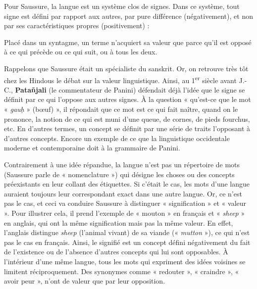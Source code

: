 Pour Saussure, la langue est un système clos de signes. Dans ce système, tout signe est défini par rapport aux autres, par pure différence (négativement), et non par ses caractéristiques propres (positivement) :
\begin{lecture}{}
Placé dans un syntagme, un terme n’acquiert sa valeur que parce qu’il est opposé à ce qui précède ou ce qui suit, ou à tous les deux.
\end{lecture}

Rappelons que Saussure était un spécialiste du sanskrit. Or, on retrouve très tôt chez les Hindous le débat sur la valeur linguistique. Ainsi, au 1\textsuperscript{er} siècle avant J.-C., \textbf{Patañjali} (le commentateur de Panini) défendait déjà l’idée que le signe se définit par ce qui l’oppose aux autres signes. À la question « qu’est-ce que le mot « \textit{gauḥ} » (bœuf) », il répondait que ce mot est ce qui fait naître, quand on le prononce, la notion de ce qui est muni d’une queue, de cornes, de pieds fourchus, etc. En d’autres termes, un concept se définit par une série de traits l’opposant à d’autres concepts. Encore un exemple de ce que la linguistique occidentale moderne et contemporaine doit à la grammaire de Panini.

Contrairement à une idée répandue, la langue n’est pas un répertoire de mots (Saussure parle de « nomenclature ») qui désigne les choses ou des concepts préexistants en leur collant des étiquettes. Si c’était le cas, les mots d’une langue auraient toujours leur correspondant exact dans une autre langue. Or, ce n’est pas le cas, et ceci va conduire Saussure à distinguer « signification » et « valeur ». Pour illustrer cela, il prend l’exemple de « mouton » en français et « \textit{sheep} » en anglais, qui ont la même signification mais pas la même valeur. En effet, l’anglais distingue \textit{sheep} (l’animal vivant) de sa viande (« \textit{mutton} »), ce qui n’est pas le cas en français. Ainsi, le signifié est un concept défini négativement du fait de l’existence ou de l’absence d’autres concepts qui lui sont
 opposables. À l’intérieur d’une même langue, tous les mots qui expriment des idées voisines se limitent réciproquement. Des synonymes comme « redouter », « craindre », « avoir peur », n’ont de valeur que par leur opposition.

